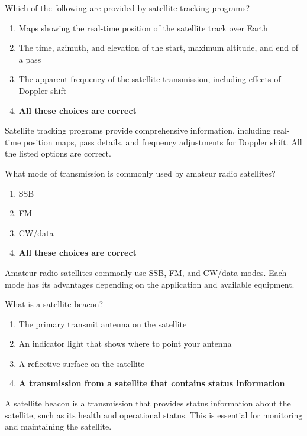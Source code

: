 
\begin{tcolorbox}[colback=gray!10!white,colframe=black!75!black,title={T8B03}]
    Which of the following are provided by satellite tracking programs?
    \begin{enumerate}[label=\Alph*),noitemsep]
        \item Maps showing the real-time position of the satellite track over Earth
        \item The time, azimuth, and elevation of the start, maximum altitude, and end of a pass
        \item The apparent frequency of the satellite transmission, including effects of Doppler shift
        \item \textbf{All these choices are correct}
    \end{enumerate}
\end{tcolorbox}
Satellite tracking programs provide comprehensive information, including real-time position maps, pass details, and frequency adjustments for Doppler shift. All the listed options are correct.


\begin{tcolorbox}[colback=gray!10!white,colframe=black!75!black,title={T8B04}]
    What mode of transmission is commonly used by amateur radio satellites?
    \begin{enumerate}[label=\Alph*),noitemsep]
        \item SSB
        \item FM
        \item CW/data
        \item \textbf{All these choices are correct}
    \end{enumerate}
\end{tcolorbox}
Amateur radio satellites commonly use SSB, FM, and CW/data modes. Each mode has its advantages depending on the application and available equipment.


\begin{tcolorbox}[colback=gray!10!white,colframe=black!75!black,title={T8B05}]
    What is a satellite beacon?
    \begin{enumerate}[label=\Alph*),noitemsep]
        \item The primary transmit antenna on the satellite
        \item An indicator light that shows where to point your antenna
        \item A reflective surface on the satellite
        \item \textbf{A transmission from a satellite that contains status information}
    \end{enumerate}
\end{tcolorbox}
A satellite beacon is a transmission that provides status information about the satellite, such as its health and operational status. This is essential for monitoring and maintaining the satellite.

